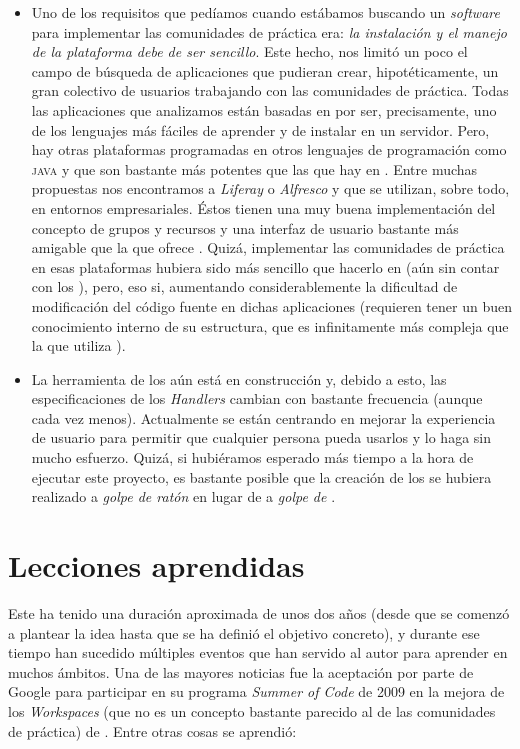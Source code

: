 \begin{itemize}
\item Uno de los requisitos que pedíamos cuando estábamos buscando un \textit{software} para implementar las comunidades de práctica era: \textit{la instalación y el manejo de la plataforma debe de ser sencillo}. Este hecho, nos limitó un poco el campo de búsqueda de aplicaciones que pudieran crear, hipotéticamente, un gran colectivo de usuarios trabajando con las comunidades de práctica. Todas las aplicaciones que analizamos están basadas en \php{} por ser, precisamente, uno de los lenguajes más fáciles de aprender y de instalar en un servidor. Pero, hay otras plataformas programadas en otros lenguajes de programación como \textsc{java} y que son bastante más potentes que las que hay en \php. Entre muchas propuestas nos encontramos a  \textit{Liferay} \cite{web:liferay} o \textit{Alfresco} \cite{web:alfresco} y que se utilizan, sobre todo, en entornos empresariales. Éstos \cms{} tienen una muy buena implementación del concepto de grupos y recursos y una interfaz de usuario bastante más amigable que la que ofrece \tiki{}. Quizá, implementar las comunidades de práctica en esas plataformas hubiera sido más sencillo que hacerlo en \tiki{} (aún sin contar con los \profiles{}), pero, eso si, aumentando considerablemente la dificultad de modificación del código fuente en dichas aplicaciones (requieren tener un buen conocimiento interno de su estructura, que es infinitamente más compleja que la que utiliza \tiki{}).

\item La herramienta de los \profiles{} aún está en construcción y, debido a esto, las especificaciones de los \textit{Handlers} cambian con bastante frecuencia (aunque cada vez menos). Actualmente se están centrando en mejorar la experiencia de usuario para permitir que cualquier persona pueda usarlos y lo haga sin mucho esfuerzo. Quizá, si hubiéramos esperado más tiempo a la hora de ejecutar este proyecto, es bastante posible que la creación de los \profiles{} se hubiera realizado a \textit{golpe de ratón} en lugar de a \textit{golpe de \yaml{}}.

\end{itemize}

\section{Lecciones aprendidas}

Este \pfc{} ha tenido una duración aproximada de unos dos años (desde que se comenzó a plantear la idea hasta que se ha definió el objetivo concreto), y durante ese tiempo han sucedido múltiples eventos que han servido al autor para aprender en muchos ámbitos. Una de las mayores noticias fue la aceptación por parte de Google para participar en su programa \textit{Summer of Code} de 2009 en la mejora de los \textit{Workspaces} (que no es un concepto bastante parecido al de las comunidades de práctica) de \tiki{}. Entre otras cosas se aprendió:

